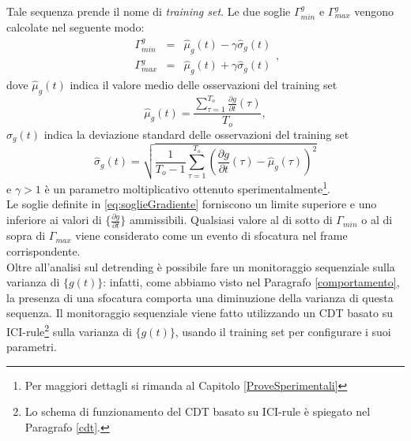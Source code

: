 Tale sequenza prende il nome di \textit{training set}.
Le due soglie $\Gamma_{min}^g$ e $\Gamma_{max}^g$ vengono calcolate nel seguente modo:
\begin{equation}
\label{eq:soglieGradiente}
\begin{array}{lcl}
\Gamma_{min}^g & = & \hat{\mu}_g(t) -\gamma \hat{\sigma}_g(t)\\
\Gamma_{max}^g & = & \hat{\mu}_g(t) + \gamma \hat{\sigma}_g(t)
\end{array},
\end{equation}
dove $\hat{\mu}_g(t)$ indica il valore medio delle osservazioni del training set
\begin{equation}
	\hat{\mu}_g(t) = \frac{\sum_{\tau = 1}^{T_{o}} \frac{\partial g}{\partial t}(\tau)}{T_{o}}, \nonumber
\end{equation}
$\hat{\sigma}_g(t)$ indica la deviazione standard delle osservazioni del training set
\begin{equation}
\hat{\sigma}_g(t)  = \sqrt{\frac{1}{T_{o}-1}\sum_{\tau=1}^{T_{o}}\left(\frac{\partial g}{\partial t}(\tau) - \hat{\mu}_g(\tau)\right)^2} \nonumber
\end{equation}
e $\gamma>1$ \`e un parametro moltiplicativo ottenuto sperimentalmente\footnote{Per maggiori dettagli si rimanda al Capitolo \ref{ProveSperimentali}}.\\
Le soglie definite in \eqref{eq:soglieGradiente} forniscono un limite superiore e uno inferiore ai valori di $\{\frac{\partial g}{\partial t}\}$ ammissibili.
Qualsiasi valore al di sotto di $\Gamma_{min}$ o al di sopra di $\Gamma_{max}$ viene considerato come un evento di sfocatura nel frame corrispondente.\\ 
Oltre all'analisi sul detrending \`e possibile fare un monitoraggio sequenziale sulla varianza di $\{g(t)\}$: infatti, come abbiamo visto nel Paragrafo \ref{comportamento}, la presenza di una sfocatura comporta una diminuzione della varianza di questa sequenza.
Il monitoraggio sequenziale viene fatto utilizzando un CDT basato su ICI-rule\footnote{Lo schema di funzionamento del CDT basato su ICI-rule \`e spiegato nel Paragrafo \ref{cdt}.} sulla varianza di $\{g(t)\}$, usando il training set per configurare i suoi parametri.


